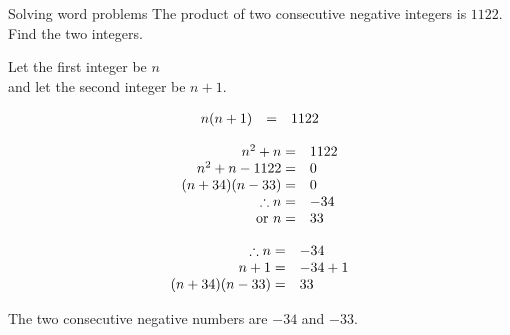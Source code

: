 \begin{wex}
{Solving word problems }
{
The product of two consecutive negative integers is $1122$. Find the two integers.
} 
{
Let the first integer be $n$ 
\\and let the second integer be $n+1$.\par 

\begin{equation*}
\begin{array}{cll}\hfill n(n+1)& =& 1122\hfill \end{array}
\end{equation*}

\begin{equation*}
    \begin{array}{cll}
	\hfill n^{2} + n =& 1122\hfill \\
\hfill n^{2} + n - 1122 =& 0\hfill \\
\hfill (n+34)(n-33) =& 0\hfill \\
	\hfill \therefore  n =& -34 \hfill \\
\hfill \mbox{ or } n =& 33\hfill 
    \end{array}
\end{equation*}

\begin{equation*}
    \begin{array}{cll}
	\hfill \therefore n =& -34\hfill \\
\hfill n + 1 =& -34 + 1\hfill \\
\hfill (n+34)(n-33) =& 33\hfill \\

    \end{array}
\end{equation*}

The two consecutive negative numbers are $-34$ and $-33$.
}
\end{wex}

